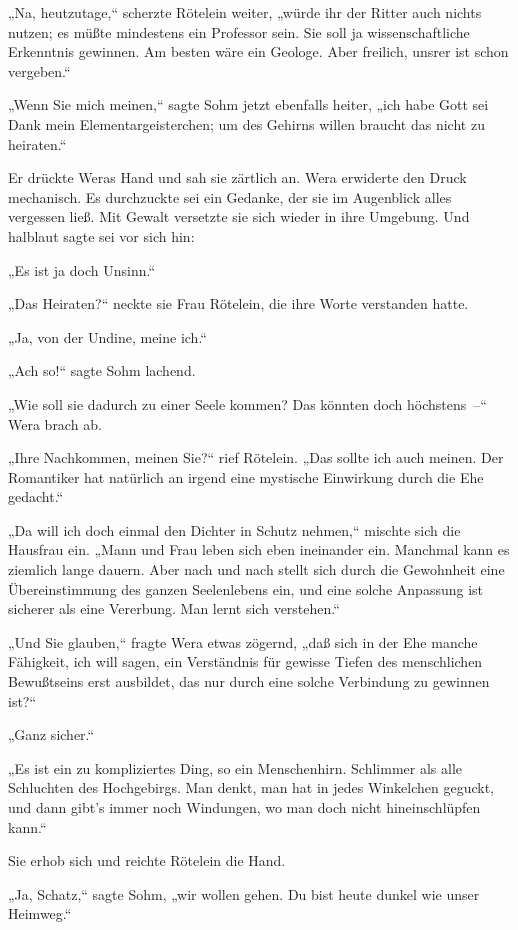 „Na, heutzutage,“ scherzte Rötelein weiter, „würde ihr der Ritter
auch nichts nutzen; es müßte mindestens ein Professor sein. Sie
soll ja wissenschaftliche Erkenntnis gewinnen. Am besten wäre ein
Geologe. Aber freilich, unsrer ist schon vergeben.“

„Wenn Sie mich meinen,“ sagte Sohm jetzt ebenfalls heiter, „ich
habe Gott sei Dank mein Elementargeisterchen; um des Gehirns willen
braucht das nicht zu heiraten.“

Er drückte Weras Hand und sah sie zärtlich an. Wera erwiderte den
Druck mechanisch. Es durchzuckte sei ein Gedanke, der sie im
Augenblick alles vergessen ließ. Mit Gewalt versetzte sie sich
wieder in ihre Umgebung. Und halblaut sagte sei vor sich hin:

„Es ist ja doch Unsinn.“

„Das Heiraten?“ neckte sie Frau Rötelein, die ihre Worte verstanden
hatte.

„Ja, von der Undine, meine ich.“

„Ach so!“ sagte Sohm lachend.

„Wie soll sie dadurch zu einer Seele kommen? Das könnten doch
höchstens~–“ Wera brach ab.

„Ihre Nachkommen, meinen Sie?“ rief Rötelein. „Das sollte ich auch
meinen. Der Romantiker hat natürlich an irgend eine mystische
Einwirkung durch die Ehe gedacht.“

„Da will ich doch einmal den Dichter in Schutz nehmen,“ mischte
sich die Hausfrau ein. „Mann und Frau leben sich eben ineinander
ein. Manchmal kann es ziemlich lange dauern. Aber nach und nach
stellt sich durch die Gewohnheit eine Übereinstimmung des ganzen
Seelenlebens ein, und eine solche Anpassung ist sicherer als eine
Vererbung. Man lernt sich verstehen.“

„Und Sie glauben,“ fragte Wera etwas zögernd, „daß sich in der Ehe
manche Fähigkeit, ich will sagen, ein Verständnis für gewisse
Tiefen des menschlichen Bewußtseins erst ausbildet, das nur durch
eine solche Verbindung zu gewinnen ist?“

„Ganz sicher.“

„Es ist ein zu kompliziertes Ding, so ein Menschenhirn. Schlimmer
als alle Schluchten des Hochgebirgs. Man denkt, man hat in jedes
Winkelchen geguckt, und dann gibt's immer noch Windungen, wo man
doch nicht hineinschlüpfen kann.“

Sie erhob sich und reichte Rötelein die Hand.

„Ja, Schatz,“ sagte Sohm, „wir wollen gehen. Du bist heute dunkel
wie unser Heimweg.“

